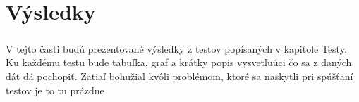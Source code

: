 \chapter{Výsledky}

\paragraph{}
V tejto časti budú prezentované výsledky z testov popísaných v kapitole Testy. Ku každému testu bude tabuľka, graf a krátky popis vysvetľuúci čo sa z daných dát dá pochopiť. Zatiaľ bohužial kvôli problémom, ktoré sa naskytli pri spúšťaní testov je to tu prázdne
